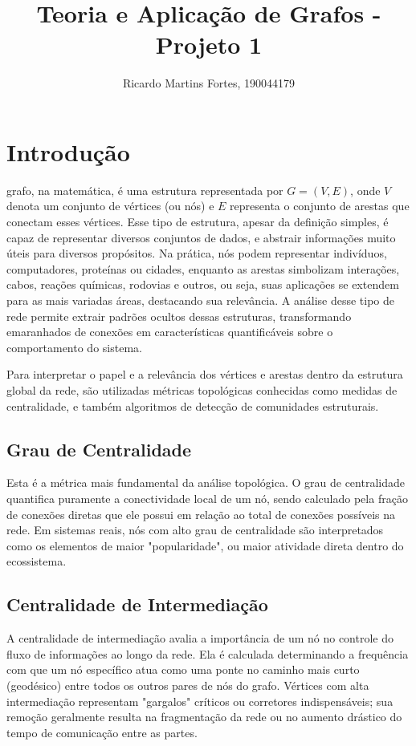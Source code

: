 \documentclass[journal]{IEEEtran}
\begin{document}
\title{Teoria e Aplicação de Grafos - Projeto 1}


\author{Ricardo Martins Fortes, 190044179}



\maketitle

\IEEEpeerreviewmaketitle


\section{Introdução}

 grafo, na matemática, é uma estrutura representada por $G = (V, E)$, onde $V$ denota um conjunto de vértices (ou nós) e $E$ representa o conjunto de arestas que conectam esses vértices. Esse tipo de estrutura, apesar da definição simples, é capaz de representar diversos conjuntos de dados, e abstrair informações muito úteis para diversos propósitos. Na prática, nós podem representar indivíduos, computadores, proteínas ou cidades, enquanto as arestas simbolizam interações, cabos, reações químicas, rodovias e outros, ou seja, suas aplicações se extendem para as mais variadas áreas, destacando sua relevância. A análise desse tipo de rede permite extrair padrões ocultos dessas estruturas, transformando emaranhados de conexões em características quantificáveis sobre o comportamento do sistema.

Para interpretar o papel e a relevância dos vértices e arestas dentro da estrutura global da rede, são utilizadas métricas topológicas conhecidas como medidas de centralidade, e também algoritmos de detecção de comunidades estruturais.

\subsection{Grau de Centralidade}
Esta é a métrica mais fundamental da análise topológica. O grau de centralidade quantifica puramente a conectividade local de um nó, sendo calculado pela fração de conexões diretas que ele possui em relação ao total de conexões possíveis na rede. Em sistemas reais, nós com alto grau de centralidade são interpretados como os elementos de maior "popularidade", ou maior atividade direta dentro do ecossistema.

\subsection{Centralidade de Intermediação}
A centralidade de intermediação avalia a importância de um nó no controle do fluxo de informações ao longo da rede. Ela é calculada determinando a frequência com que um nó específico atua como uma ponte no caminho mais curto (geodésico) entre todos os outros pares de nós do grafo. Vértices com alta intermediação representam "gargalos" críticos ou corretores indispensáveis; sua remoção geralmente resulta na fragmentação da rede ou no aumento drástico do tempo de comunicação entre as partes.
\end{document}
